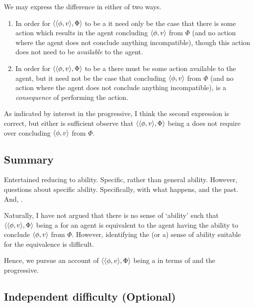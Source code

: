 \begin{note}
  We may express the difference in either of two ways.
  \begin{enumerate}[label=\arabic*.]
  \item
    In order for \(\langle \langle \phi, v \rangle, \Phi \rangle\) to be a \fc{} it need only be the case that there is some action which results in the agent concluding \(\langle \phi, v \rangle\) from \(\Phi\) (and no action where the agent does not conclude anything incompatible), though this action does not need to be \emph{available} to the agent.
  \item
    In order for \(\langle \langle \phi, v \rangle, \Phi \rangle\) to be a \fc{} there must be some action available to the agent, but it need not be the case that concluding \(\langle \phi, v \rangle\) from \(\Phi\) (and no action where the agent does not conclude anything incompatible), is a \emph{consequence} of performing the action.
  \end{enumerate}
  As indicated by interest in the progressive, I think the second expression is correct, but either is sufficient observe that \(\langle \langle \phi, v \rangle, \Phi \rangle\) being a \fc{} does not require \AbControl{} over concluding \(\langle \phi, v \rangle\) from \(\Phi\).
\end{note}

\subsection{Summary}

\begin{note}
  Entertained reducing  to ability.
  Specific, rather than general ability.
  However, questions about specific ability.
  Specifically, with what happens, and the past.
  And, \AbControl{}.
\end{note}

\begin{note}
  Naturally, I have not argued that there is no sense of `ability' such that \(\langle \langle \phi, v \rangle, \Phi \rangle\) being a  for an agent is equivalent to the agent having the ability to conclude \(\langle \phi, v \rangle\) from \(\Phi\).
  However, identifying the (or a) sense of ability suitable for the equivalence is difficult.

  Hence, we pursue an account of \(\langle \langle \phi, v \rangle, \Phi \rangle\) being a  in terms of  and the progressive.
\end{note}

\subsection[Independent difficulty]{Independent difficulty \hfill (Optional)}


